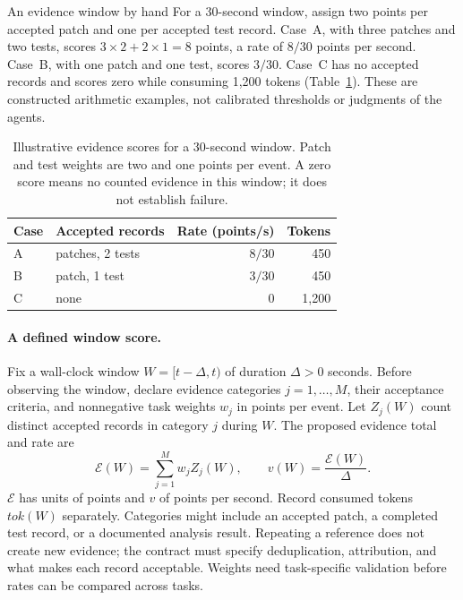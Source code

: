 \documentclass[11pt,a4paper]{article}
\theoremstyle{definition}
\theoremstyle{remark}
\begin{document}
\begin{pdexample}{An evidence window by hand}
For a 30-second window, assign two points per accepted patch and one per
accepted test record. Case~A, with three patches and two tests, scores
$3\times2+2\times1=8$ points, a rate of $8/30$ points per second. Case~B, with
one patch and one test, scores $3/30$. Case~C has no accepted records and
scores zero while consuming 1,200 tokens (Table~\ref{tab:cadence-verdicts}).
These are constructed arithmetic examples, not calibrated thresholds or
judgments of the agents.

\end{pdexample}

\begin{table}[H]
\centering
\caption{Illustrative evidence scores for a 30-second window. Patch and test
weights are two and one points per event. A zero score means no counted evidence
in this window; it does not establish failure.}
\label{tab:cadence-verdicts}
\begin{tabularx}{\textwidth}{@{}l >{\raggedright\arraybackslash}X r r@{}}
\toprule
\textbf{Case} & \textbf{Accepted records} & \textbf{Rate (points/s)} & \textbf{Tokens} \\
\midrule
A & 3 patches, 2 tests & $8/30$ & 450 \\
B & 1 patch, 1 test & $3/30$ & 450 \\
C & none & $0$ & 1,200 \\
\bottomrule
\end{tabularx}
\end{table}

\paragraph{A defined window score.}
Fix a wall-clock window $W=[t-\Delta,t)$ of duration $\Delta>0$ seconds.
Before observing the window, declare evidence categories $j=1,\ldots,M$, their
acceptance criteria, and nonnegative task weights $w_j$ in points per event.
Let $Z_j(W)$ count distinct accepted records in category $j$ during $W$.
The proposed evidence total and rate are
\[
 \mathcal{E}(W)=\sum_{j=1}^{M}w_jZ_j(W),\qquad
 v(W)=\frac{\mathcal{E}(W)}{\Delta}.
\]
$\mathcal{E}$ has units of points and $v$ of points per second. Record consumed tokens
$\mathit{tok}(W)$ separately. Categories might include an accepted patch, a completed test
record, or a documented analysis result. Repeating a reference does not create
new evidence; the contract must specify deduplication, attribution, and what
makes each record acceptable. Weights need task-specific validation before
rates can be compared across tasks.
\end{document}
